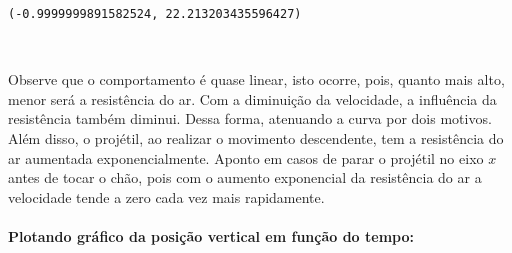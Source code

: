\documentclass[12pt, a4paper]{article}
\makeatletter
\newcommand{\boxspacing}{\kern\kvtcb@left@rule\kern\kvtcb@boxsep}
\newcommand{\prompt}[4]{
        {\ttfamily\llap{{\color{#2}[#3]:\hspace{3pt}#4}}\vspace{-\baselineskip}}
    }
\makeatother
\begin{document}
            \begin{tcolorbox}[breakable, size=fbox, boxrule=.5pt, pad at break*=1mm, opacityfill=0]
\prompt{Out}{outcolor}{21}{\boxspacing}
\begin{Verbatim}[commandchars=\\\{\}]
(-0.9999999891582524, 22.213203435596427)
\end{Verbatim}
\end{tcolorbox}
        
    \begin{center}
    \end{center}
    { \hspace*{\fill} \\}
    
    Observe que o comportamento é quase linear, isto ocorre, pois, quanto
mais alto, menor será a resistência do ar. Com a diminuição da
velocidade, a influência da resistência também diminui. Dessa forma,
atenuando a curva por dois motivos. Além disso, o projétil, ao realizar
o movimento descendente, tem a resistência do ar aumentada
exponencialmente. Aponto em casos de parar o projétil no eixo \(x\)
antes de tocar o chão, pois com o aumento exponencial da resistência do
ar a velocidade tende a zero cada vez mais rapidamente.

\hypertarget{plotando-gruxe1fico-da-posiuxe7uxe3o-vertical-em-funuxe7uxe3o-do-tempo}{%
\paragraph{Plotando gráfico da posição vertical em função do
tempo:}\label{plotando-gruxe1fico-da-posiuxe7uxe3o-vertical-em-funuxe7uxe3o-do-tempo}}
\end{document}
